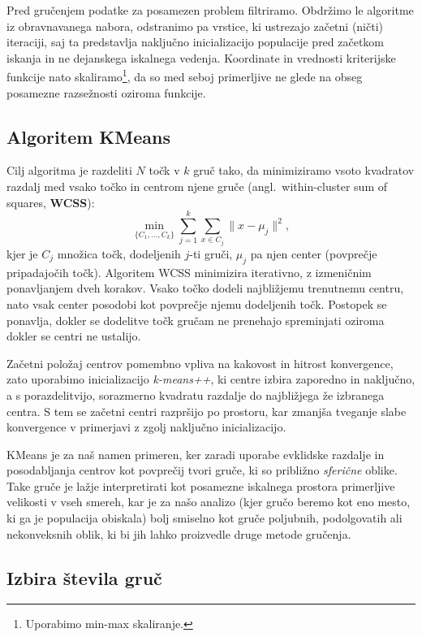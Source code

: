 \documentclass[a4paper, 12pt]{book}
\begin{document}
Pred gručenjem podatke za posamezen problem filtriramo. Obdržimo le
algoritme iz obravnavanega nabora, odstranimo pa vrstice, ki ustrezajo
začetni (ničti) iteraciji, saj ta predstavlja naključno inicializacijo
populacije pred začetkom iskanja in ne dejanskega iskalnega vedenja.
Koordinate in vrednosti kriterijske funkcije nato skaliramo\footnote{Uporabimo min-max skaliranje.}, da so med seboj primerljive ne glede na obseg
posamezne razsežnosti oziroma funkcije.

\subsection{Algoritem KMeans}

Cilj algoritma je razdeliti $N$ točk v $k$ gruč tako, da minimiziramo vsoto
kvadratov razdalj med vsako točko in centrom njene gruče (angl.\ within-cluster sum of squares,
\textbf{WCSS}):
\[
    \min_{\{C_1, \dots, C_k\}} \sum_{j=1}^{k} \sum_{x \in C_j} \lVert x - \mu_j \rVert^2,
\]
kjer je $C_j$ množica točk, dodeljenih $j$-ti gruči, $\mu_j$ pa njen center
(povprečje pripadajočih točk). Algoritem WCSS minimizira iterativno, z
izmeničnim ponavljanjem dveh korakov. Vsako točko dodeli najbližjemu
trenutnemu centru, nato vsak center posodobi kot povprečje njemu dodeljenih
točk. Postopek se ponavlja, dokler se dodelitve točk gručam ne prenehajo
spreminjati oziroma dokler se centri ne ustalijo.

Začetni položaj centrov pomembno vpliva na kakovost in hitrost konvergence,
zato uporabimo inicializacijo \emph{k-means++}, ki centre izbira zaporedno in
naključno, a s porazdelitvijo, sorazmerno kvadratu razdalje do najbližjega že
izbranega centra. S tem se začetni centri razpršijo po prostoru, kar
zmanjša tveganje slabe konvergence v primerjavi z zgolj naključno
inicializacijo.

KMeans je za naš namen primeren, ker zaradi uporabe evklidske razdalje in
posodabljanja centrov kot povprečij tvori gruče, ki so približno
\emph{sferične} oblike. Take gruče je lažje interpretirati kot posamezne
 iskalnega prostora primerljive velikosti v vseh smereh, kar je za našo analizo (kjer gručo beremo kot eno mesto, ki ga je populacija obiskala) bolj smiselno kot gruče poljubnih, podolgovatih ali
nekonveksnih oblik, ki bi jih lahko proizvedle druge metode gručenja.

\subsection{Izbira števila gruč}
\end{document}

